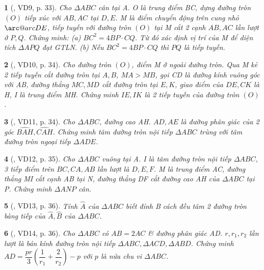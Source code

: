 \documentclass{article}
\makeatletter
\newcommand{\arc@char}{{\usefont{U}{tipa}{m}{n}\symbol{62}}}%
\newcommand{\arc}[1]{\mathpalette\arc@arc{#1}}
\newcommand{\arc@arc}[2]{%
	\sbox0{$\m@th#1#2$}%
	\vbox{
		\hbox{\resizebox{\wd0}{\height}{\arc@char}}
		\nointerlineskip
		\box0
	}%
}
\newtheorem{baitoan}{}
\makeatother
\begin{document}
\begin{baitoan}[\cite{TLCT_THCS_Toan_9_hinh_hoc}, VD9, p. 33]
	Cho $\Delta ABC$ cân tại A. O là trung điểm BC, dựng đường tròn $(O)$ tiếp xúc với $AB,AC$ tại $D,E$. M là điểm chuyển động trên cung nhỏ $\arc{DE}$, tiếp tuyến với đường tròn $(O)$ tại M cắt 2 cạnh $AB,AC$ lần lượt ở $P,Q$. Chứng minh: (a) $BC^2 = 4BP\cdot CQ$. Từ đó xác định vị trí của M để diện tích $\Delta APQ$ đạt {\rm GTLN}. (b) Nếu $BC^2 = 4BP\cdot CQ$ thì $PQ$ là tiếp tuyến.
\end{baitoan}

\begin{baitoan}[\cite{TLCT_THCS_Toan_9_hinh_hoc}, VD10, p. 34]
	Cho đường tròn $(O)$, điểm M ở ngoài đường tròn. Qua M kẻ 2 tiếp tuyến cắt đường tròn tại $A,B$, $MA > MB$, gọi CD là đường kính vuông góc với AB, đường thẳng $MC,MD$ cắt đường tròn tại $E,K$, giao điểm của $DE,CK$ là H, I là trung điểm MH. Chứng minh $IE,IK$ là 2 tiếp tuyến của đường tròn $(O)$.
\end{baitoan}

\begin{baitoan}[\cite{TLCT_THCS_Toan_9_hinh_hoc}, VD11, p. 34]
	Cho $\Delta ABC$, đường cao AH. $AD,AE$ là đường phân giác của 2 góc $\widehat{BAH},\widehat{CAH}$. Chứng minh tâm đường tròn nội tiếp $\Delta ABC$ trùng với tâm đường tròn ngoại tiếp $\Delta ADE$.
\end{baitoan}

\begin{baitoan}[\cite{TLCT_THCS_Toan_9_hinh_hoc}, VD12, p. 35]
	Cho $\Delta ABC$ vuông tại A. I là tâm đường tròn nội tiếp $\Delta ABC$, 3 tiếp điểm trên $BC,CA,AB$ lần lượt là $D,E,F$. M là trung điểm AC, đường thẳng MI cắt cạnh AB tại N, đường thẳng DF cắt đường cao AH của $\Delta ABC$ tại P. Chứng minh $\Delta ANP$ cân.
\end{baitoan}

\begin{baitoan}[\cite{TLCT_THCS_Toan_9_hinh_hoc}, VD13, p. 36]
	Tính $\widehat{A}$ của $\Delta ABC$ biết đỉnh B cách đều tâm 2 đường tròn bàng tiếp của $\widehat{A},\widehat{B}$ của $\Delta ABC$.
\end{baitoan}

\begin{baitoan}[\cite{TLCT_THCS_Toan_9_hinh_hoc}, VD14, p. 36]
	Cho $\Delta ABC$ có $AB = 2AC$ \& đường phân giác AD. $r,r_1,r_2$ lần lượt là bán kính đường tròn nội tiếp $\Delta ABC,\Delta ACD,\Delta ABD$. Chứng minh $AD = \dfrac{pr}{3}\left(\dfrac{1}{r_1} + \dfrac{2}{r_2}\right) - p$ với $p$ là nửa chu vi $\Delta ABC$.
\end{baitoan}
\end{document}
